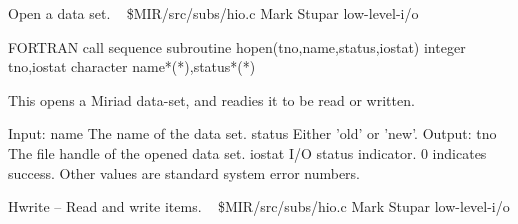 %
\noindent Open a data set.
\newline \ 
\newline {} \$MIR/src/subs/hio.c
\newline {} Mark Stupar
\newline {} low-level-i/o
\par{\tenpoint
{\eightpoint\begintt
FORTRAN call sequence
        subroutine hopen(tno,name,status,iostat)
        integer tno,iostat
        character name*(*),status*(*)

  This opens a Miriad data-set, and readies it to be read or written.

  Input:
    name        The name of the data set.
    status      Either 'old' or 'new'.
  Output:
    tno         The file handle of the opened data set.
   iostat       I/O status indicator. 0 indicates success. Other values
                are standard system error numbers.                      
\endtt}
\par}
%
\noindent Hwrite -- Read and write items.
\newline \ 
\newline {} \$MIR/src/subs/hio.c
\newline {} Mark Stupar
\newline \abox{Keywords:} low-level-i/o

